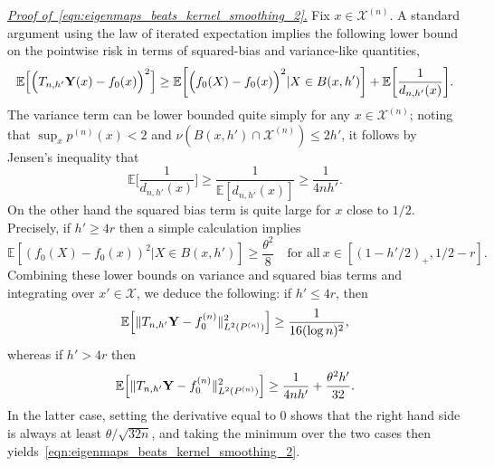 \documentclass[aos]{imsart}
\theoremstyle{plain}
\theoremstyle{definition}
\theoremstyle{remark}
\newcommand{\Ebb}{\mathbb{E}}
\newcommand{\mc}[1]{\mathcal{#1}}
\newcommand{\1}{\mathbf{1}}
\begin{document}
\underline{\emph{Proof of~\eqref{eqn:eigenmaps_beats_kernel_smoothing_2}}.}
Fix $x \in \mc{X}^{(n)}$. A standard argument using the law of iterated expectation implies the following lower bound on the pointwise risk in terms of squared-bias and variance-like quantities,
\begin{equation*}
\Ebb\Bigl[\Bigl(T_{n,h'}{\bf Y}(x) - f_0(x)\Bigr)^2\Bigr] \geq \Ebb\biggl[\Bigl(f_0(X) - f_0(x)\Bigr)^2|X \in B(x,h')\biggr] + \Ebb\biggl[\frac{1}{d_{n,h'}(x)}\biggr].
\end{equation*}
The variance term can be lower bounded quite simply for any $x \in \mc{X}^{(n)}$; noting that $\sup_{x} p^{(n)}(x) < 2$ and $\nu(B(x,h') \cap \mc{X}^{(n)}) \leq 2h'$, it follows by Jensen's inequality that 
\begin{equation*}
\Ebb\biggl[\frac{1}{d_{n,h'}(x)}\biggr] \geq \frac{1}{\Ebb[d_{n,h'}(x)]} \geq \frac{1}{4nh'}.
\end{equation*}
On the other hand the squared bias term is quite large for $x$ close to $1/2$. Precisely, if $h' \geq 4r$ then a simple calculation implies
\begin{equation*}
\Ebb[(f_0(X) - f_0(x))^2|X \in B(x,h')] \geq \frac{\theta^2}{8} \quad \textrm{for all}~x \in [(1 - h'/2)_{+}, 1/2 - r].
\end{equation*}
Combining these lower bounds on variance and squared bias terms and integrating over $x' \in \mc{X}$, we deduce the following: if $h' \leq 4r$, then
\begin{equation*}
\Ebb\Bigl[\|T_{n,h'}{\bf Y} - f_0^{(n)}\|_{L^2(P^{(n)})}^2\Bigr] \geq \frac{1}{16(\log n)^2},
\end{equation*}
whereas if $h' > 4r$  then
\begin{equation*}\Ebb\Bigl[\|T_{n,h'}{\bf Y} - f_0^{(n)}\|_{L^2(P^{(n)})}^2\Bigr] \geq \frac{1}{4nh'} + \frac{\theta^2h'}{32}.
\end{equation*}
In the latter case, setting the derivative equal to $0$ shows that the right hand side is always at least $\theta/\sqrt{32 n}$, and taking the minimum over the two cases then yields~\eqref{eqn:eigenmaps_beats_kernel_smoothing_2}.
\end{document}
